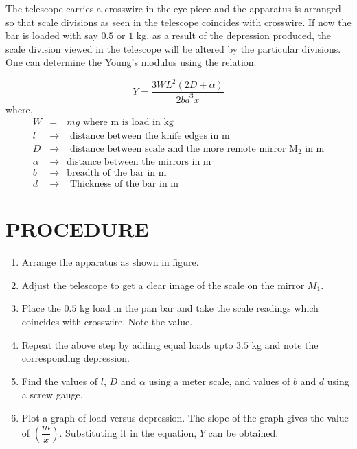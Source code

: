 \documentclass[12pt,a4paper]{article}
\begin{document}
		The telescope carries a crosswire in the eye-piece and the apparatus is arranged so that scale divisions as seen in the telescope coincides with crosswire. If now the bar is loaded with say $0.5$ or $1$ {kg}, as a result of the depression produced, the scale division viewed in the telescope will be altered by the particular divisions. One can determine the Young's modulus using the relation: 
		
		\begin{equation}
		Y=\dfrac{3WL^2(2D+\alpha)}{2bd^3x}
		\end{equation}
		where,  	
		\begin{eqnarray*}
			W &=& mg \text{ where m is load in kg} \\
			l &\rightarrow& \text{ distance between the knife edges in m}\\ 
			D &\rightarrow& \text{ distance between scale and the more remote mirror M$_2$ in m}\\
			\alpha &\rightarrow& \text{distance between the mirrors in m} \\ 
			b &\rightarrow& \text{breadth of the bar in m}\\
			d &\rightarrow& \text{ Thickness of the bar in m}
		\end{eqnarray*}
	
	\section{PROCEDURE}
		\begin{enumerate}
			\item Arrange the apparatus as shown in figure.
			\item Adjust the telescope to get a clear image of the scale on the mirror $M_1$.
			\item Place the $0.5$ kg load in the pan bar and take the scale readings which coincides with crosswire. Note the value.
			\item Repeat the above step by adding equal loads upto $3.5$ kg and note the corresponding depression.
			\item Find the values of $l$, $D$ and $\alpha$ using a meter scale, and values of $b$ and $d$ using a screw gauge.
			\item Plot a graph of load versus depression. The slope of the graph gives the value of $\left(\dfrac{m}{x}\right)$. Substituting it in the equation, $Y$ can be obtained.
		\end{enumerate}
		
\end{document}
